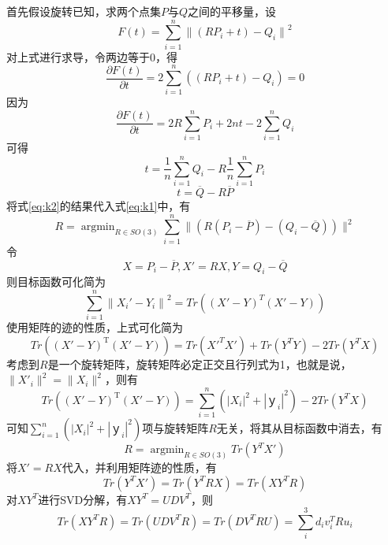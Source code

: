 首先假设旋转已知，求两个点集$P$与$Q$之间的平移量，设
\begin{equation}
    F(t) = \sum_{i=1}^n{\|(RP_i + t)-Q_i \|}^2
    \label{eq:k1}
\end{equation}
对上式进行求导，令两边等于0，得
\begin{equation}
    \frac{\partial F(t)}{\partial t}=2\sum_{i=1}^n{((RP_i + t)-Q_i)}=0
\end{equation}
因为
\begin{equation}
    \frac{\partial F(t)}{\partial t}=2R\sum_{i=1}^n{P_i} +2nt - 2\sum_{i=1}^n{Q_i}
\end{equation}
可得
\begin{equation}
    t = \frac{1}{n}\sum_{i=1}^n{Q_i}-R\frac{1}{n}\sum_{i=1}^n{P_i}
\end{equation}
\begin{equation}
    t = \overline{Q}-R\overline{P}
    \label{eq:k2}
\end{equation}
将式\ref{eq:k2}的结果代入式\ref{eq:k1}中，有
\begin{equation}
    R = \mathop{\arg\min}_{R \in SO(3)} \sum_{i=1}^n\|(R(P_i - \overline{P})-(Q_i - \overline{Q}))\|^2
\end{equation}
令
$$
    X = P_i - \overline{P}, X' = RX, Y= Q_i - \overline{Q}
$$
则目标函数可化简为
\begin{equation}
    \sum_{i=1}^n {\|X_i' - Y_i\|}^2=Tr((X'-Y)^T(X'-Y))
\end{equation}
使用矩阵的迹的性质，上式可化简为
\begin{equation}
    Tr((X'-Y)^\mathrm{T}(X'-Y)) = Tr({X'}^{T}X') + Tr(Y^{T}Y) - 2Tr(Y^{T}X)
\end{equation}
考虑到$R$是一个旋转矩阵，旋转矩阵必定正交且行列式为1，也就是说，$\|{X'}_i\|^2 = \|X_i\|^2 $，则有
\begin{equation}
    Tr((X'-Y)^\mathrm{T}(X'-Y)) = \sum_{i=1}^n {(|X_i|^2 +|ｙ_i|^2)}- 2Tr(Y^{T}X)
\end{equation}
可知$\sum_{i=1}^n {(|X_i|^2 +|ｙ_i|^2)}$项与旋转矩阵$R$无关，将其从目标函数中消去，有
\begin{equation}
    R = \mathop{\arg\min}_{R \in SO(3)} Tr(Y^TX')
\end{equation}
将$X'=RX$代入，并利用矩阵迹的性质，有
\begin{equation}
    Tr(Y^TX')=Tr(Y^TRX)=Tr(XY^TR)
\end{equation}
对$XY^T$进行SVD分解，有$XY^T=UDV^T$，则
\begin{equation}
    Tr(XY^TR)=Tr(UDV^TR)=Tr(DV^TRU)=\sum_i^3{d_iv_i^TRu_i}
\end{equation}
